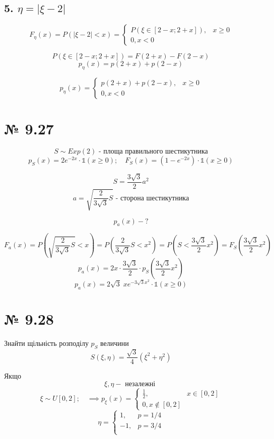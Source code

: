 \documentclass[11pt, a4paper]{article} %
\begin{document}
\subsection*{5. $\eta =|\xi-2|$}

$$F_\eta(x) = P(|\xi-2| < x) = \begin{cases}
    P(\xi \in [2-x;2+x]),& x\ge0\\
    0, x<0
\end{cases}$$

$$P(\xi \in [2-x;2+x]) = F(2+x)-F(2-x)$$
$$p_\eta(x) = p(2+x)+p(2-x)$$

$$p_\eta(x) = \begin{cases}
    p(2+x)+p(2-x),& x\ge0\\
    0, x<0
\end{cases}$$

\section*{№ 9.27}
\begin{mdframed}
    $$S \sim Exp(2) \text{ - площа правильного шестикутника}$$
    $$p_S(x) = 2e^{-2x}\cdot \mathbb{1}(x\ge 0);\quad F_S(x) = \left(1-e^{-2x}\right)\cdot \mathbb{1}(x\ge 0)$$

    $$S = \frac{3\sqrt{3}}{2} a^2 $$
    $$a = \sqrt{\frac{2}{3\sqrt{3}} S} \text{ - сторона шестикутника}$$

    $$p_a(x) - ?$$
\end{mdframed}

$$F_a(x) = P(\sqrt{\frac{2}{3\sqrt{3}} S} < x) = P(\frac{2}{3\sqrt 3} S < x^2) 
= P(S < \frac{3\sqrt 3}{2}x^2 ) = F_S(\frac{3\sqrt 3}{2}x^2)$$
$$p_a(x) = 2x\cdot \frac{3\sqrt 3}{2} \cdot p_S(\frac{3\sqrt 3}{2}x^2) $$
$$p_a(x) = 2\sqrt{3} \; x e^{-3\sqrt 3 x^2} \cdot \mathbb{1}(x\ge 0)$$

\section*{№ 9.28}
\begin{mdframed}
    Знайти щільність розподілу $p_S$ величини
    $$S(\xi,\eta) = \frac{\sqrt 3}{4}\left(\xi^2 + \eta^2\right)$$

    Якщо 
    $$\xi, \eta - \text{ незалежні }$$
    $$\xi \sim U[0,2]; \quad \implies p_\xi(x) = \begin{cases}
        \frac{1}{2},& x\in [0,2]\\
        0, x\notin [0,2]
    \end{cases}$$
    $$\eta = \begin{cases}
        1,& p=1/4\\
        -1,& p=3/4\\
    \end{cases}$$
\end{mdframed}
\end{document}
